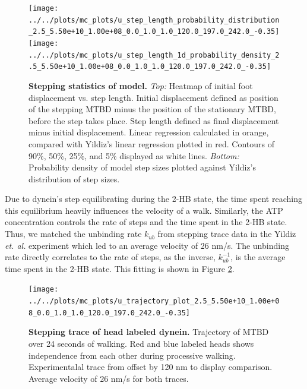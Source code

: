 \documentclass[9pt,twocolumn,twoside]{article}
\begin{document}
\begin{figure}[tbhp]
\centering
\texttt{[image: ../../plots/mc\_plots/u\_step\_length\_probability\_distribution\_2.5\_5.50e+10\_1.00e+08\_0.0\_1.0\_1.0\_120.0\_197.0\_242.0\_-0.35]}
\texttt{[image: ../../plots/mc\_plots/u\_step\_length\_1d\_probability\_density\_2.5\_5.50e+10\_1.00e+08\_0.0\_1.0\_1.0\_120.0\_197.0\_242.0\_-0.35]}
\caption[Stepping statistics of model]{\textbf{Stepping statistics of model.} \textit{Top: } Heatmap of initial foot displacement vs. step length. Initial displacement defined as position of the stepping MTBD minus the position of the stationary MTBD, before the step takes place. Step length defined as final displacement minus initial displacement. Linear regression calculated in orange, compared with Yildiz's linear regression plotted in red. Contours of 90\%, 50\%, 25\%, and 5\% displayed as white lines. \textit{Bottom: } Probability density of model step sizes plotted against Yildiz's distribution of step sizes. }
\label{fig:SteppingPlots}
\end{figure}

\newpage

Due to dynein's step equilibrating during the 2-HB state, the time spent reaching this equilibrium heavily influences the velocity of a walk. Similarly, the ATP concentration controls the rate of steps and the time spent in the 2-HB state. Thus, we matched the unbinding rate $k_{ub}$ from stepping trace data in the Yildiz \textit{et. al.} experiment which led to an average velocity of 26 nm/s. The unbinding rate directly correlates to the rate of steps, as the inverse, $k_{ub}^{-1}$, is the average time spent in the 2-HB state. This fitting is shown in Figure \ref{fig:TrajPlot}.


\begin{figure}[ht]
	\centering
	\texttt{[image: ../../plots/mc\_plots/u\_trajectory\_plot\_2.5\_5.50e+10\_1.00e+08\_0.0\_1.0\_1.0\_120.0\_197.0\_242.0\_-0.35]}
	\caption[Stepping trace of head labeled dynein]{\textbf{Stepping trace of head labeled dynein.} Trajectory of MTBD over 24 seconds of walking. Red and blue labeled heads shows independence from each other during processive walking. Experimentalal trace from \cite{Dewitt2012} offset by 120 nm to display comparison. Average velocity of 26 nm/s for both traces.}
	\label{fig:TrajPlot}
\end{figure}
\end{document}
